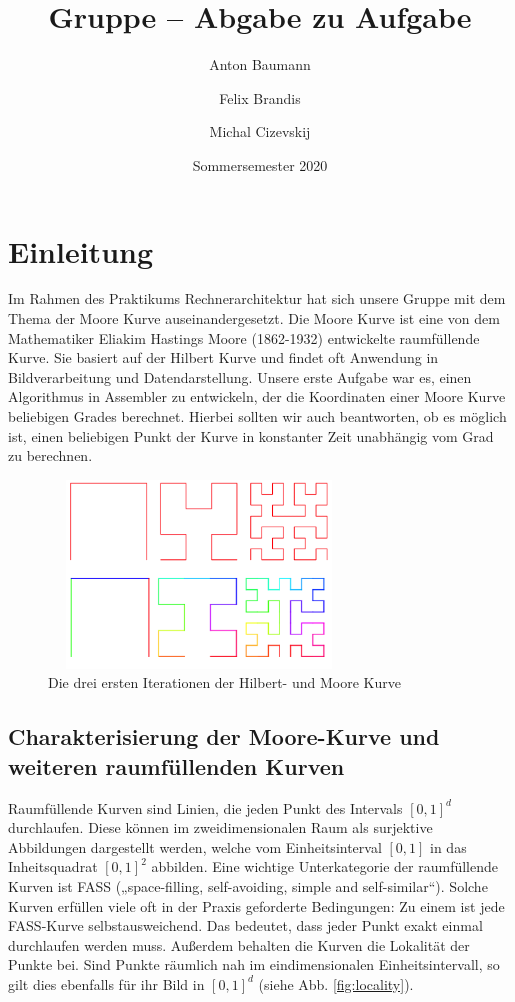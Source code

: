 \documentclass[course=erap]{aspdoc}
\author{Anton Baumann \and Felix Brandis \and Michal Cizevskij}
\date{Sommersemester 2020}  %
\title{Gruppe \theGroup{} -- Abgabe zu Aufgabe \theNumber}
\begin{document}
\maketitle

\section{Einleitung}
Im Rahmen des Praktikums Rechnerarchitektur hat sich unsere Gruppe mit dem Thema der Moore Kurve auseinandergesetzt. Die Moore Kurve ist eine von dem Mathematiker Eliakim Hastings Moore (1862-1932) entwickelte raumfüllende Kurve. Sie basiert auf der Hilbert Kurve und findet oft Anwendung in Bildverarbeitung und Datendarstellung. Unsere erste Aufgabe war es, einen Algorithmus in Assembler zu entwickeln, der die Koordinaten einer Moore Kurve beliebigen Grades berechnet. Hierbei sollten wir auch beantworten, ob es möglich ist, einen beliebigen Punkt der Kurve in konstanter Zeit unabhängig vom Grad zu berechnen.

\begin{figure}[h]
\centering
    \includegraphics[width=8cm, height=5cm]{Moore_and_Hilbert}
    \caption{Die drei ersten Iterationen der Hilbert- und Moore Kurve}
    \label{fig:mooreCurve}
\end{figure}

\subsection{Charakterisierung der Moore-Kurve und weiteren raumfüllenden Kurven}
Raumfüllende Kurven sind Linien, die jeden Punkt des Intervals $[0,1]^d$ durchlaufen. Diese können im zweidimensionalen Raum als surjektive Abbildungen dargestellt werden, welche vom Einheitsinterval $[0,1]$ in das Inheitsquadrat $[0,1]^2$ abbilden. 
\newline
Eine wichtige Unterkategorie der raumfüllende Kurven ist FASS („space-filling, self-avoiding, simple and self-similar“). Solche Kurven erfüllen viele oft in der Praxis geforderte Bedingungen: Zu einem ist jede FASS-Kurve selbstausweichend. Das bedeutet, dass jeder Punkt exakt einmal durchlaufen werden muss. Außerdem behalten die Kurven die Lokalität der Punkte bei. Sind Punkte räumlich nah im eindimensionalen Einheitsintervall, so gilt dies ebenfalls für ihr Bild in $[0,1]^d$ (siehe Abb. \ref{fig:locality}). %
\end{document}
